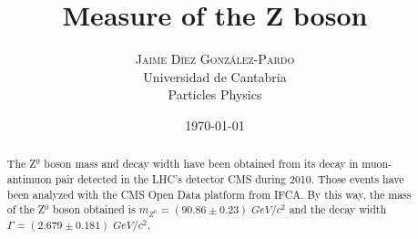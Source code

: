 \documentclass[twoside]{article}
\title{
	\vspace{-15mm}
	\fontsize{28pt}{10pt}
	\selectfont\textbf{Measure of the Z boson}%
}
\author{
	\large
	\textsc{Jaime D\'iez Gonz\'alez-Pardo}\\[4mm]
	\fontsize{28pt}{10pt} Universidad de Cantabria \\ %
	\normalsize Particles Physics \\ 
}
\date{ \today}
\begin{document}
	\maketitle %


	\thispagestyle{fancy} %


	\begin{abstract}

		\noindent%

			The Z$^0$ boson mass and decay width have been obtained from its decay in muon-antimuon pair detected in the LHC's detector CMS during 2010. Those events have been analyzed with the CMS Open Data platform from IFCA. By this way, the mass of the Z$^0$ boson obtained is $m_{Z^0} = ( 90.86 \pm 0.23 ) \; GeV/c^2$ and the decay width $\Gamma = ( 2.679 \pm 0.181 ) \; GeV/c^2$.

	\end{abstract}

\end{document}
